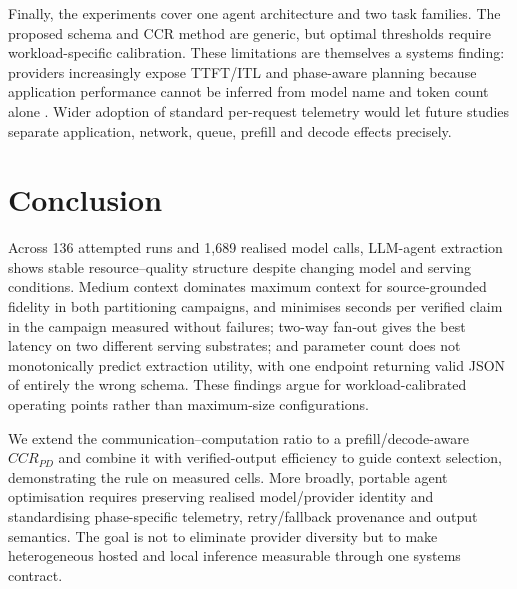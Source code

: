\documentclass[conference]{IEEEtran}
\begin{document}
Finally, the experiments cover one agent architecture and two task families. The proposed schema and CCR method are generic, but optimal thresholds require workload-specific calibration. These limitations are themselves a systems finding: providers increasingly expose TTFT/ITL and phase-aware planning because application performance cannot be inferred from model name and token count alone \cite{nvidiaDynamoPlanner,mlperf2025llm}. Wider adoption of standard per-request telemetry would let future studies separate application, network, queue, prefill and decode effects precisely.

\section{Conclusion}
Across 136 attempted runs and 1{,}689 realised model calls, LLM-agent extraction shows stable resource--quality structure despite changing model and serving conditions. Medium context dominates maximum context for source-grounded fidelity in both partitioning campaigns, and minimises seconds per verified claim in the campaign measured without failures; two-way fan-out gives the best latency on two different serving substrates; and parameter count does not monotonically predict extraction utility, with one endpoint returning valid JSON of entirely the wrong schema. These findings argue for workload-calibrated operating points rather than maximum-size configurations.

We extend the communication--computation ratio to a prefill/decode-aware $CCR_{PD}$ and combine it with verified-output efficiency to guide context selection, demonstrating the rule on measured cells. More broadly, portable agent optimisation requires preserving realised model/provider identity and standardising phase-specific telemetry, retry/fallback provenance and output semantics. The goal is not to eliminate provider diversity but to make heterogeneous hosted and local inference measurable through one systems contract.

\balance


\end{document}

